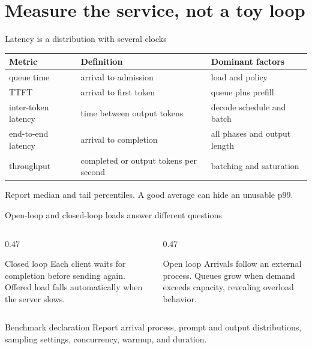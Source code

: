 \documentclass[handout]{beamer}
\begin{document}
\section{Measure the service, not a toy loop}

\begin{frame}{Latency is a distribution with several clocks}
  \small
  \begin{tabular}{@{}>{\raggedright\arraybackslash}p{.20\linewidth}>{\raggedright\arraybackslash}p{.35\linewidth}>{\raggedright\arraybackslash}p{.35\linewidth}@{}}
    \toprule
    Metric & Definition & Dominant factors \\
    \midrule
    queue time & arrival to admission & load and policy \\
    TTFT & arrival to first token & queue plus prefill \\
    inter-token latency & time between output tokens & decode schedule and batch \\
    end-to-end latency & arrival to completion & all phases and output length \\
    throughput & completed or output tokens per second & batching and saturation \\
    \bottomrule
  \end{tabular}
  \vfill
  Report median and tail percentiles. A good average can hide an unusable p99.
\end{frame}

\begin{frame}{Open-loop and closed-loop loads answer different questions}
  \begin{columns}[t]
    \begin{column}{0.47\linewidth}
      \begin{block}{Closed loop}
        Each client waits for completion before sending again. Offered load falls automatically when the server slows.
      \end{block}
    \end{column}
    \begin{column}{0.47\linewidth}
      \begin{block}{Open loop}
        Arrivals follow an external process. Queues grow when demand exceeds capacity, revealing overload behavior.
      \end{block}
    \end{column}
  \end{columns}
  \begin{alertblock}{Benchmark declaration}
    Report arrival process, prompt and output distributions, sampling settings, concurrency, warmup, and duration.
  \end{alertblock}
\end{frame}
\end{document}

